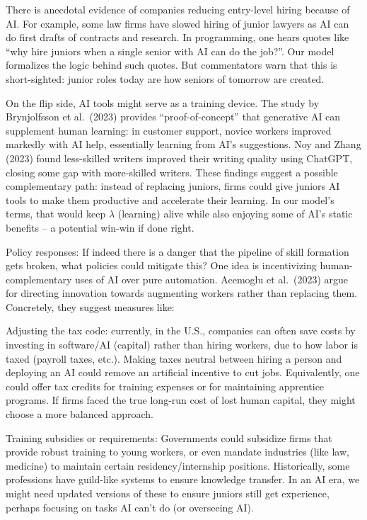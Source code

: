 \documentclass[12pt]{article}
\begin{document}
{There is anecdotal evidence of companies {reducing
entry-level hiring} because of AI. For example, some law firms have
slowed hiring of junior lawyers as AI can do first drafts of
contracts and research. In programming, one hears quotes like
{``why hire juniors when a single senior with AI can do the
job?''}. Our model formalizes the logic behind such quotes. But
commentators warn that this is short-sighted: junior roles today are
how seniors of tomorrow are created.

On the flip side, AI tools might serve as a {training device}.
The study by Brynjolfsson et al.~(2023) provides
{``proof-of-concept'' that generative AI can supplement human
learning}: in customer support, novice workers improved markedly
with AI help, essentially learning from AI's suggestions. Noy and
Zhang (2023) found less-skilled writers improved their writing
quality using ChatGPT, closing some gap with more-skilled writers.
These findings suggest a possible {complementary} path: instead
of replacing juniors, firms could give juniors AI tools to make them
productive and accelerate their learning. In our model's terms, that
would keep \(\lambda\) (learning) alive while also enjoying some of
AI's static benefits -- a potential win-win if done right.

{Policy responses:} If indeed there is a danger that the
pipeline of skill formation gets broken, what policies could mitigate
this? One idea is {incentivizing human-complementary uses of
AI} over pure automation. Acemoglu et al.~(2023) argue for directing
innovation towards augmenting workers rather than replacing them.
Concretely, they suggest measures like:

Adjusting the {tax code}: currently, in the U.S., companies
can often save costs by investing in software/AI (capital) rather
than hiring workers, due to how labor is taxed (payroll taxes,
etc.). Making taxes neutral between hiring a person and deploying an
AI could remove an artificial incentive to cut jobs. Equivalently,
one could offer tax credits for training expenses or for maintaining
apprentice programs. If firms faced the true long-run cost of lost
human capital, they might choose a more balanced approach.

{Training subsidies or requirements}: Governments could
subsidize firms that provide robust training to young workers, or
even mandate industries (like law, medicine) to maintain certain
residency/internship positions. Historically, some professions have
{guild-like systems} to ensure knowledge transfer. In an AI
era, we might need updated versions of these to ensure juniors still
get experience, perhaps focusing on tasks AI can't do (or overseeing
AI).

}
\end{document}
